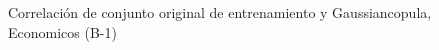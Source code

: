 \begin{figure}[H]
    \centering
    
    \caption{Correlación de conjunto original de entrenamiento y Gaussiancopula, Economicos (B-1)}
    \label{pairwise-economicos-b-1-gaussiancopula}
\end{figure}